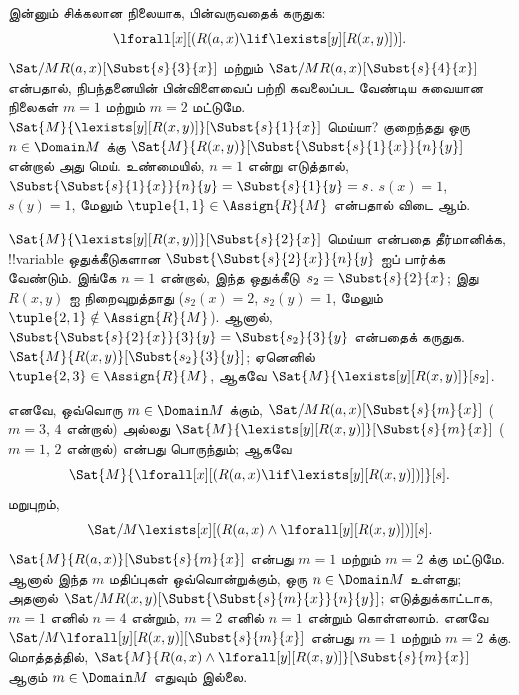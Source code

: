 \documentclass[../../../include/open-logic-section]{subfiles}
\begin{document}
\begin{ex}

இன்னும் சிக்கலான நிலையாக, பின்வருவதைக் கருதுக:
\[
\lforall[x][(R(a,x) \lif \lexists[y][R(x,y)])].
\]
$\Sat/{M}{R(a,x)}[\Subst{s}{3}{x}]$ மற்றும்
$\Sat/{M}{R(a,x)}[\Subst{s}{4}{x}]$ என்பதால், நிபந்தனையின்
பின்விளைவைப் பற்றி கவலைப்பட வேண்டிய சுவையான நிலைகள் $m = 1$
மற்றும் $m = 2$ மட்டுமே. $\Sat{M}{\lexists[y][R(x,y)]}[\Subst{s}{1}{x}]$
மெய்யா? குறைந்தது ஒரு $n \in \Domain M$ க்கு
$\Sat{M}{R(x,y)}[\Subst{\Subst{s}{1}{x}}{n}{y}]$ என்றால் அது மெய்.
உண்மையில், $n = 1$ என்று எடுத்தால்,
$\Subst{\Subst{s}{1}{x}}{n}{y} = \Subst{s}{1}{y} =
s$. $s(x) = 1$, $s(y) = 1$, மேலும்
$\tuple{1,1} \in \Assign{R}{M}$ என்பதால் விடை ஆம்.

$\Sat{M}{\lexists[y][R(x,y)]}[\Subst{s}{2}{x}]$ மெய்யா என்பதை
தீர்மானிக்க, !!{variable} ஒதுக்கீடுகளான
$\Subst{\Subst{s}{2}{x}}{n}{y}$ ஐப் பார்க்க வேண்டும். இங்கே $n = 1$
என்றால், இந்த ஒதுக்கீடு~$s_2 = \Subst{s}{2}{x}$; இது $R(x,y)$ ஐ
நிறைவுறுத்தாது ($s_2(x) =
2$, $s_2(y) = 1$, மேலும் $\tuple{2,1}\notin \Assign{R}{M}$). ஆனால்,
$\Subst{\Subst{s}{2}{x}}{3}{y} = \Subst{s_2}{3}{y}$ என்பதைக் கருதுக.
$\Sat{M}{R(x,y)}[\Subst{s_2}{3}{y}]$; ஏனெனில் $\tuple{2,3} \in
\Assign{R}{M}$, ஆகவே $\Sat{M}{\lexists[y][R(x,y)]}[s_2]$.

எனவே, ஒவ்வொரு $m \in \Domain M$ க்கும்,
$\Sat/{M}{R(a,x)}[\Subst{s}{m}{x}]$ ($m = 3$, $4$ என்றால்) அல்லது
$\Sat{M}{\lexists[y][R(x,y)]}[\Subst{s}{m}{x}]$ ($m = 1$, $2$ என்றால்)
என்பது பொருந்தும்; ஆகவே
\[
\Sat{M}{\lforall[x][(R(a,x) \lif \lexists[y][R(x,y)])]}[s].
\]
மறுபுறம்,
\[
\Sat/{M}{\lexists[x][(R(a,x) \land \lforall[y][R(x,y)])]}[s].
\]
$\Sat{M}{R(a,x)}[\Subst{s}{m}{x}]$ என்பது $m = 1$ மற்றும் $m =
2$ க்கு மட்டுமே. ஆனால் இந்த $m$ மதிப்புகள் ஒவ்வொன்றுக்கும், ஒரு $n \in
\Domain M$ உள்ளது; அதனால்
$\Sat/{M}{R(x,y)}[\Subst{\Subst{s}{m}{x}}{n}{y}]$;
எடுத்துக்காட்டாக, $m=1$ எனில் $n=4$ என்றும், $m=2$ எனில் $n=1$ என்றும்
கொள்ளலாம். எனவே
$\Sat/{M}{\lforall[y][R(x,y)]}[\Subst{s}{m}{x}]$ என்பது $m = 1$ மற்றும் $m =
2$ க்கு. மொத்தத்தில், $\Sat{M}{R(a,x)
\land \lforall[y][R(x,y)]}[\Subst{s}{m}{x}]$ ஆகும்
$m \in \Domain M$ எதுவும் இல்லை.
\end{ex}
\end{document}
